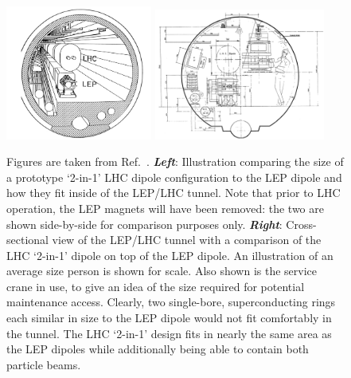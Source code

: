 \begin{figure}[!htb]
    \begin{center}
        \includegraphics[width=0.43\textwidth]{figures/chapter2/lhc_lep_dipole_comp}
        \includegraphics[width=0.50\textwidth]{figures/chapter2/lhc_lep_dipole_comp_person}
        \caption{
            Figures are taken from Ref.~\cite{ECFALHCinLEP}.
            \textbf{\textit{Left}}: Illustration comparing the size of a prototype `2-in-1' LHC dipole configuration to the
                LEP dipole and how they fit inside of the LEP/LHC tunnel. Note that prior to LHC operation,
                the LEP magnets will have been removed: the two are shown side-by-side for comparison purposes only.
            \textbf{\textit{Right}}: Cross-sectional view of the LEP/LHC tunnel with a comparison of the LHC `2-in-1' dipole
                on top of the LEP dipole. An illustration of an average size person is shown
                for scale. Also shown is the service crane in use, to give an idea of the size required
                for potential maintenance access. Clearly, two single-bore, superconducting rings each similar in size
                to the LEP dipole would not fit comfortably in the tunnel. The LHC `2-in-1' design fits
                in nearly the same area as the LEP dipoles while additionally being able to contain both
                particle beams.
        }
        \label{fig:lhc_lep_dipole_comp}
    \end{center}
\end{figure}

